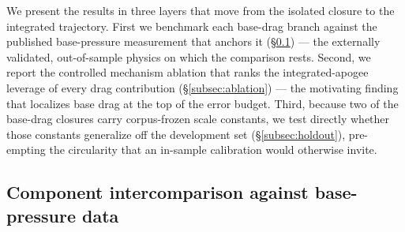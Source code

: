 \label{sec:results}%

We present the results in three layers that move from the isolated closure to
the integrated trajectory. First we benchmark each base-drag branch against the
published base-pressure measurement that anchors it
(\S\ref{subsec:component}) --- the externally validated, out-of-sample physics
on which the comparison rests. Second, we report the controlled mechanism
ablation that ranks the integrated-apogee leverage of every drag contribution
(\S\ref{subsec:ablation}) --- the motivating finding that localizes base drag
at the top of the error budget. Third, because two of the base-drag closures
carry corpus-frozen scale constants, we test directly whether those constants
generalize off the development set (\S\ref{subsec:holdout}), pre-empting the
circularity that an in-sample calibration would otherwise invite.

\subsection{Component intercomparison against base-pressure data}
\label{subsec:component}

